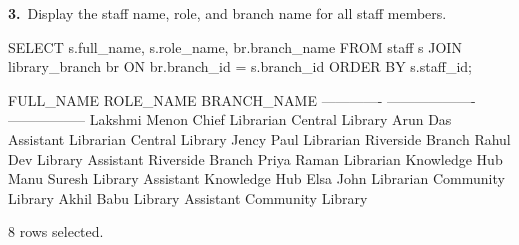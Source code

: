 \noindent\begin{minipage}{\linewidth}
\begingroup{}
{\fontsize{14}{17}\selectfont\textbf{3.}}\ Display the staff name, role, and branch name for all staff members.\par
\endgroup\vspace{12pt}


\begin{sqlcode}
SELECT s.full_name, s.role_name, br.branch_name
FROM staff s
JOIN library_branch br ON br.branch_id = s.branch_id
ORDER BY s.staff_id;
\end{sqlcode}

\vspace{18pt}


\begin{sqlout}[fontsize=\small]
FULL_NAME      ROLE_NAME            BRANCH_NAME      
-------------  -------------------  -----------------
Lakshmi Menon  Chief Librarian      Central Library
Arun Das       Assistant Librarian  Central Library
Jency Paul     Librarian            Riverside Branch
Rahul Dev      Library Assistant    Riverside Branch
Priya Raman    Librarian            Knowledge Hub
Manu Suresh    Library Assistant    Knowledge Hub
Elsa John      Librarian            Community Library
Akhil Babu     Library Assistant    Community Library

8 rows selected.
\end{sqlout}
\end{minipage}\par\vspace{24pt}

